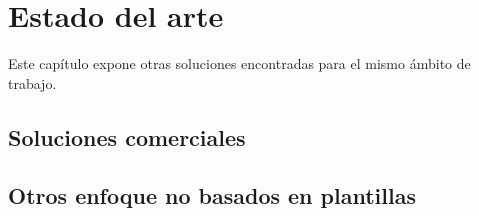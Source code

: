 
\chapter{Estado del arte}
\label{chap:estado-arte}

Este capítulo expone otras soluciones encontradas para el mismo ámbito de trabajo.

\section{Soluciones comerciales}

\section{Otros enfoque no basados en plantillas}

